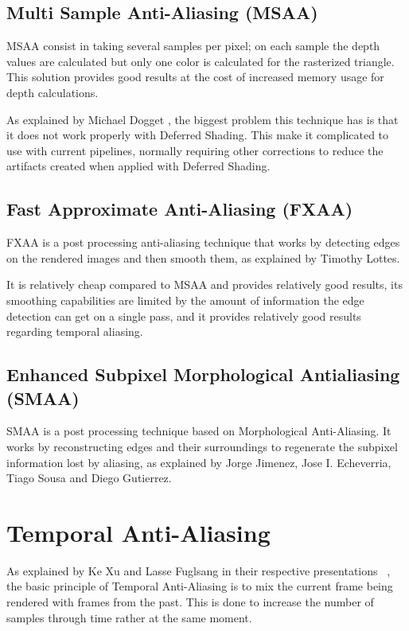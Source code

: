 \documentclass{cslthse-msc}
\begin{document}
\subsection{Multi Sample Anti-Aliasing (MSAA)}
MSAA consist in taking several samples per pixel; on each sample the depth values are calculated but only one color is calculated for the rasterized triangle. This solution provides good results at the cost of increased memory usage for depth calculations. 

As explained by Michael Dogget \cite{Doggett2017EDAN35}, the biggest problem this technique has is that it does not work properly with Deferred Shading. This make it complicated to use with current pipelines, normally requiring other corrections to reduce the artifacts created when applied with Deferred Shading.

\subsection{Fast Approximate Anti-Aliasing (FXAA)}
FXAA is a post processing anti-aliasing technique that works by detecting edges on the rendered images and then smooth them, as explained by Timothy Lottes. \cite{Lottes2009}

It is relatively cheap compared to MSAA and provides relatively good results, its smoothing capabilities are limited by the amount of information the edge detection can get on a single pass, and it provides relatively good results regarding temporal aliasing.

\subsection{Enhanced Subpixel Morphological Antialiasing (SMAA)}
SMAA is a post processing technique based on Morphological Anti-Aliasing. It works by reconstructing edges and their surroundings to regenerate the subpixel information lost by aliasing, as explained by Jorge Jimenez, Jose I. Echeverria, Tiago Sousa and Diego Gutierrez. \cite{Jimenez2012}

\section{Temporal Anti-Aliasing}
As explained by Ke Xu and Lasse Fuglsang in their respective presentations ~\cite{Fuglsand2016,XU2016}, the basic principle of Temporal Anti-Aliasing is to mix the current frame being rendered with frames from the past. This is done to increase the number of samples through time rather at the same moment. 
\end{document}
